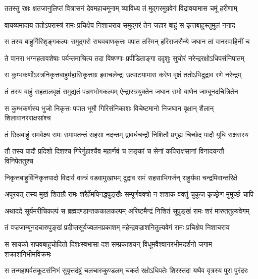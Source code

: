 \twolineshloka
{ततस्तु रक्षः क्षतजानुलिप्तं वित्रासनं देवमहाचमूनाम्}
{व्याविध्य तं मुद्गरमुग्रवेगं विद्रावयामास चमूं हरीणाम्} %

\twolineshloka
{वायव्यमादाय ततोऽपरास्त्रं रामः प्रचिक्षेप निशाचराय}
{समुद्गरं तेन जहार बाहुं स कृत्तबाहुस्तुमुलं ननाद} %

\twolineshloka
{स तस्य बाहुर्गिरिशृङ्गकल्पः समुद्गरो राघवबाणकृत्तः}
{पपात तस्मिन् हरिराजसैन्ये जघान तां वानरवाहिनीं च} %

\twolineshloka
{ते वानरा भग्नहतावशेषाः पर्यन्तमाश्रित्य तदा विषण्णाः}
{प्रपीडिताङ्गा ददृशुः सुघोरं नरेन्द्ररक्षोऽधिपसंनिपातम्} %

\twolineshloka
{स कुम्भकर्णोऽस्त्रनिकृत्तबाहुर्महासिकृत्ताग्र इवाचलेन्द्रः}
{उत्पाटयामास करेण वृक्षं ततोऽभिदुद्राव रणे नरेन्द्रम्} %

\twolineshloka
{तं तस्य बाहुं सहतालवृक्षं समुद्यतं पन्नगभोगकल्पम्}
{ऐन्द्रास्त्रयुक्तेन जघान रामो बाणेन जाम्बूनदचित्रितेन} %

\twolineshloka
{स कुम्भकर्णस्य भुजो निकृत्तः पपात भूमौ गिरिसंनिकाशः}
{विचेष्टमानो निजघान वृक्षान् शैलान् शिलावानरराक्षसांश्च} %

\twolineshloka
{तं छिन्नबाहुं समवेक्ष्य रामः समापतन्तं सहसा नदन्तम्}
{द्वावर्धचन्द्रौ निशितौ प्रगृह्य चिच्छेद पादौ युधि राक्षसस्य} %

\twolineshloka
{तौ तस्य पादौ प्रदिशो दिशश्च गिरेर्गुहाश्चैव महार्णवं च}
{लङ्कां च सेनां कपिराक्षसानां विनादयन्तौ विनिपेततुश्च} %

\twolineshloka
{निकृत्तबाहुर्विनिकृत्तपादो विदार्य वक्त्रं वडवामुखाभम्}
{दुद्राव रामं सहसाभिगर्जन् राहुर्यथा चन्द्रमिवान्तरिक्षे} %

\twolineshloka
{अपूरयत् तस्य मुखं शिताग्रै रामः शरैर्हेमपिनद्धपुङ्खैः}
{सम्पूर्णवक्त्रो न शशाक वक्तुं चुकूज कृच्छ्रेण मुमूर्च्छ चापि} %

\twolineshloka
{अथाददे सूर्यमरीचिकल्पं स ब्रह्मदण्डान्तककालकल्पम्}
{अरिष्टमैन्द्रं निशितं सुपुङ्खं रामः शरं मारुततुल्यवेगम्} %

\twolineshloka
{तं वज्रजाम्बूनदचारुपुङ्खं प्रदीप्तसूर्यज्वलनप्रकाशम्}
{महेन्द्रवज्राशनितुल्यवेगं रामः प्रचिक्षेप निशाचराय} %

\twolineshloka
{स सायको राघवबाहुचोदितो दिशःस्वभासा दश सम्प्रकाशयन्}
{विधूमवैश्वानरभीमदर्शनो जगाम शक्राशनिभीमविक्रमः} %

\twolineshloka
{स तन्महापर्वतकूटसंनिभं सुवृत्तदंष्ट्रं चलचारुकुण्डलम्}
{चकर्त रक्षोऽधिपतेः शिरस्तदा यथैव वृत्रस्य पुरा पुरंदरः} %

